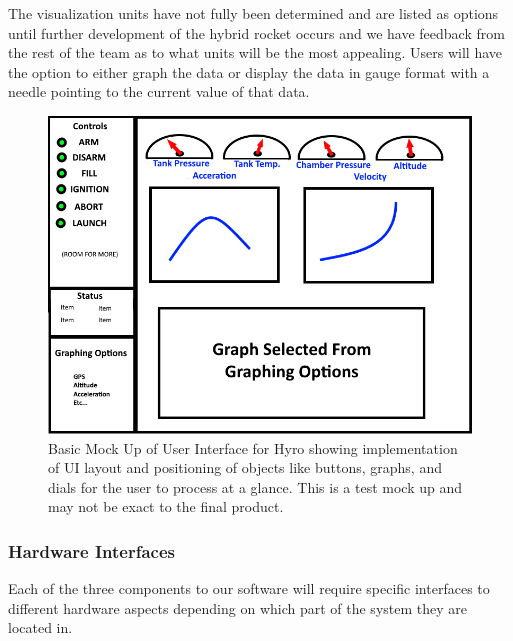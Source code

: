 \documentclass[10pt,draftclsnofoot,onecolumn,compsoc]{IEEEtran}
\begin{document}
The visualization units have not fully been determined and are listed as options until further development of the hybrid rocket occurs and we have feedback from the rest of the team as to what units will be the most appealing. Users will have the option to either graph the data or display the data in gauge format with a needle pointing to the current value of that data. \par


\begin{figure}
  \caption{Basic Mock Up of User Interface for Hyro showing implementation of UI layout and positioning of objects like buttons, graphs, and dials for the user to process at a glance. This is a test mock up and may not be exact to the final product. }
  \centering
	\includegraphics[scale=.75]{HyRoUIMockup}
\end{figure}
\FloatBarrier
\subsubsection{Hardware Interfaces}
Each of the three components to our software will require specific interfaces to different hardware aspects depending on which part of the system they are located in.\par
\end{document}
